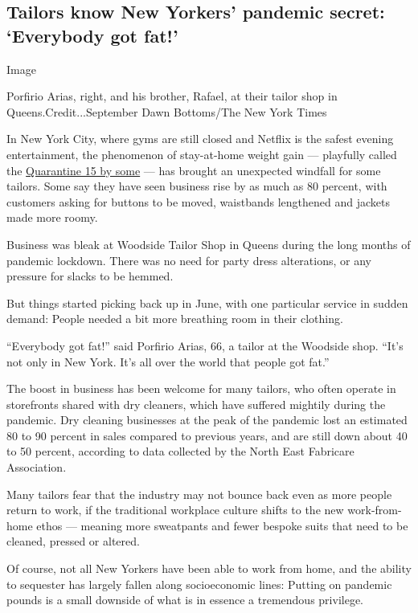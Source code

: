 \hypertarget{tailors-know-new-yorkers-pandemic-secret-everybody-got-fat}{%
\subsection{Tailors know New Yorkers' pandemic secret: `Everybody got
fat!'}\label{tailors-know-new-yorkers-pandemic-secret-everybody-got-fat}}

Image

Porfirio Arias, right, and his brother, Rafael, at their tailor shop in
Queens.Credit...September Dawn Bottoms/The New York Times

In New York City, where gyms are still closed and Netflix is the safest
evening entertainment, the phenomenon of stay-at-home weight gain ---
playfully called the
\href{https://www.yalemedicine.org/stories/quarantine-15-weight-gain-pandemic/}{Quarantine
15 by some} --- has brought an unexpected windfall for some tailors.
Some say they have seen business rise by as much as 80 percent, with
customers asking for buttons to be moved, waistbands lengthened and
jackets made more roomy.

Business was bleak at Woodside Tailor Shop in Queens during the long
months of pandemic lockdown. There was no need for party dress
alterations, or any pressure for slacks to be hemmed.

But things started picking back up in June, with one particular service
in sudden demand: People needed a bit more breathing room in their
clothing.

``Everybody got fat!'' said Porfirio Arias, 66, a tailor at the Woodside
shop. ``It's not only in New York. It's all over the world that people
got fat.''

The boost in business has been welcome for many tailors, who often
operate in storefronts shared with dry cleaners, which have suffered
mightily during the pandemic. Dry cleaning businesses at the peak of the
pandemic lost an estimated 80 to 90 percent in sales compared to
previous years, and are still down about 40 to 50 percent, according to
data collected by the North East Fabricare Association.

Many tailors fear that the industry may not bounce back even as more
people return to work, if the traditional workplace culture shifts to
the new work-from-home ethos --- meaning more sweatpants and fewer
bespoke suits that need to be cleaned, pressed or altered.

Of course, not all New Yorkers have been able to work from home, and the
ability to sequester has largely fallen along socioeconomic lines:
Putting on pandemic pounds is a small downside of what is in essence a
tremendous privilege.

